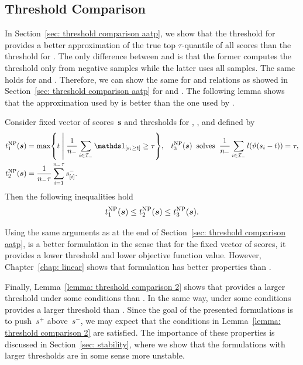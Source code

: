 \subsection{Threshold Comparison}\label{subsec: threshold comparison NP}

In Section~\ref{sec: threshold comparison aatp}, we show that the threshold for \TopMeanK provides a better approximation of the true top $\tau$-quantile of all scores than the threshold for \PatMat. The only difference between \tauFPL and \TopMeanK is that the former computes the threshold only from negative samples while the latter uses all samples. The same holds for \PatMatNP and \PatMat. Therefore, we can show the same for \tauFPL and \PatMatNP relations as showed in Section~\ref{sec: threshold comparison aatp} for \TopMeanK and \PatMat. The following lemma shows that the approximation used by \tauFPL is better than the one used by \PatMatNP.

\begin{lemma}\label{lemma: threshold comparison NP}
  Consider fixed vector of scores~$\bm{s}$ and thresholds for \GrillNP, \tauFPL, and \PatMatNP defined by
  \begin{align*}
    t_1^{\rm NP}(\bm{s}) &
      = \max \Set{t}{\frac{1}{\nneg} \sum_{i \in \Ineg} \Iverson{s_i \geq t} \geq \tau}, &
    t_3^{\rm NP}(\bm{s}) &
    \;\; \text{solves} \;\; \frac{1}{\nneg} \sum_{i \in \Ineg} l\Brac{\vartheta(s_i - t)} = \tau, \\
    t_2^{\rm NP}(\bm{s}) &
      = \frac{1}{\nneg \tau} \sum_{i=1}^{\nneg \tau} s^{-}_{[i]}.
  \end{align*}
  Then the following inequalities hold
  \begin{equation*}
    t_1^{\rm NP}(\bm{s}) \leq t_2^{\rm NP}(\bm{s}) \leq t_3^{\rm NP}(\bm{s}).
  \end{equation*}
\end{lemma}

Using the same arguments as at the end of Section~\ref{sec: threshold comparison aatp}, \tauFPL is a better formulation in the sense that for the fixed vector of scores, it provides a lower threshold and lower objective function value. However, Chapter~\ref{chap: linear} shows that \PatMatNP formulation has better properties than \tauFPL.

Finally, Lemma~\ref{lemma: threshold comparison 2} shows that \Grill provides a larger threshold under some conditions than \GrillNP. In the same way, \TopMeanK under some conditions provides a larger threshold than \tauFPL. Since the goal of the presented formulations is to push~$s^+$ above~$s^-$, we may expect that the conditions in Lemma~\ref{lemma: threshold comparison 2} are satisfied. The importance of these properties is discussed in Section~\ref{sec: stability}, where we show that the formulations with larger thresholds are in some sense more unstable.

